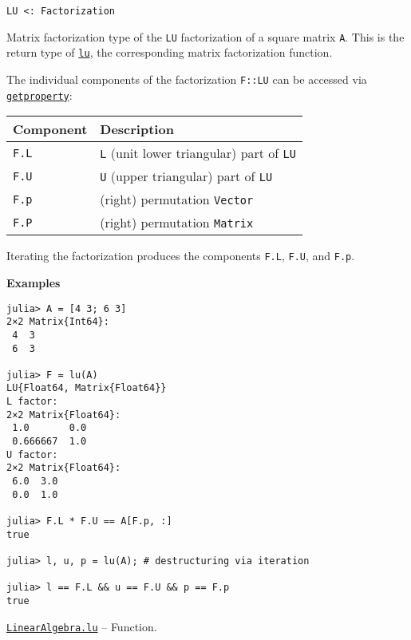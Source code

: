\begin{adjustwidth}{2em}{0pt}


\begin{verbatim}
LU <: Factorization
\end{verbatim}

Matrix factorization type of the \texttt{LU} factorization of a square matrix \texttt{A}. This is the return type of \hyperlink{5672569096214810830}{\texttt{lu}}, the corresponding matrix factorization function.

The individual components of the factorization \texttt{F::LU} can be accessed via \hyperlink{11040282462516403506}{\texttt{getproperty}}:


\begin{table}[h]

\begin{tabulary}{\linewidth}{|L|L|}
\hline
Component & Description \\
\hline
\texttt{F.L} & \texttt{L} (unit lower triangular) part of \texttt{LU} \\
\hline
\texttt{F.U} & \texttt{U} (upper triangular) part of \texttt{LU} \\
\hline
\texttt{F.p} & (right) permutation \texttt{Vector} \\
\hline
\texttt{F.P} & (right) permutation \texttt{Matrix} \\
\hline
\end{tabulary}

\end{table}

Iterating the factorization produces the components \texttt{F.L}, \texttt{F.U}, and \texttt{F.p}.

\textbf{Examples}


\begin{verbatim}
julia> A = [4 3; 6 3]
2×2 Matrix{Int64}:
 4  3
 6  3

julia> F = lu(A)
LU{Float64, Matrix{Float64}}
L factor:
2×2 Matrix{Float64}:
 1.0       0.0
 0.666667  1.0
U factor:
2×2 Matrix{Float64}:
 6.0  3.0
 0.0  1.0

julia> F.L * F.U == A[F.p, :]
true

julia> l, u, p = lu(A); # destructuring via iteration

julia> l == F.L && u == F.U && p == F.p
true
\end{verbatim}



\end{adjustwidth}
\hypertarget{5672569096214810830}{}
\hyperlink{5672569096214810830}{\texttt{LinearAlgebra.lu}}  -- {Function.}

